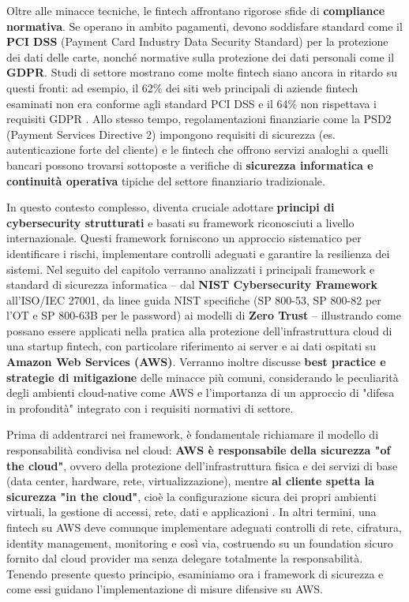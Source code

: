 \documentclass[a4paper,12pt]{report}
\begin{document}
Oltre alle minacce tecniche, le fintech affrontano rigorose sfide di \textbf{compliance normativa}. Se operano in ambito pagamenti, devono soddisfare standard come il \textbf{PCI DSS} (Payment Card Industry Data Security Standard) per la protezione dei dati delle carte, nonché normative sulla protezione dei dati personali come il \textbf{GDPR}. Studi di settore mostrano come molte fintech siano ancora in ritardo su questi fronti: ad esempio, il 62\% dei siti web principali di aziende fintech esaminati non era conforme agli standard PCI DSS e il 64\% non rispettava i requisiti GDPR \cite{sproWhitepaper}. Allo stesso tempo, regolamentazioni finanziarie come la PSD2 (Payment Services Directive 2) impongono requisiti di sicurezza (es. autenticazione forte del cliente) e le fintech che offrono servizi analoghi a quelli bancari possono trovarsi sottoposte a verifiche di \textbf{sicurezza informatica e continuità operativa} tipiche del settore finanziario tradizionale.

In questo contesto complesso, diventa cruciale adottare \textbf{principi di cybersecurity strutturati} e basati su framework riconosciuti a livello internazionale. Questi framework forniscono un approccio sistematico per identificare i rischi, implementare controlli adeguati e garantire la resilienza dei sistemi. Nel seguito del capitolo verranno analizzati i principali framework e standard di sicurezza informatica – dal \textbf{NIST Cybersecurity Framework} all'ISO/IEC 27001, da linee guida NIST specifiche (SP 800-53, SP 800-82 per l'OT e SP 800-63B per le password) ai modelli di \textbf{Zero Trust} – illustrando come possano essere applicati nella pratica alla protezione dell'infrastruttura cloud di una startup fintech, con particolare riferimento ai server e ai dati ospitati su \textbf{Amazon Web Services (AWS)}. Verranno inoltre discusse \textbf{best practice e strategie di mitigazione} delle minacce più comuni, considerando le peculiarità degli ambienti cloud-native come AWS e l'importanza di un approccio di "difesa in profondità" integrato con i requisiti normativi di settore.

Prima di addentrarci nei framework, è fondamentale richiamare il modello di responsabilità condivisa nel cloud: \textbf{AWS è responsabile della sicurezza "of the cloud"}, ovvero della protezione dell'infrastruttura fisica e dei servizi di base (data center, hardware, rete, virtualizzazione), mentre \textbf{al cliente spetta la sicurezza "in the cloud"}, cioè la configurazione sicura dei propri ambienti virtuali, la gestione di accessi, rete, dati e applicazioni \cite{awsResponsibility}. In altri termini, una fintech su AWS deve comunque implementare adeguati controlli di rete, cifratura, identity management, monitoring e così via, costruendo su un foundation sicuro fornito dal cloud provider ma senza delegare totalmente la responsabilità. Tenendo presente questo principio, esaminiamo ora i framework di sicurezza e come essi guidano l'implementazione di misure difensive su AWS.
\end{document}
